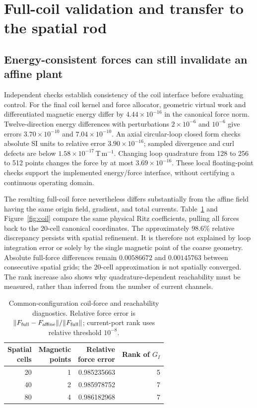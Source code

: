 \section{Full-coil validation and transfer to the spatial rod}
\label{sec:physical-results}

\subsection{Energy-consistent forces can still invalidate an affine plant}
Independent checks establish consistency of the coil interface before evaluating control. For the final coil kernel and force allocator, geometric virtual work and differentiated magnetic energy differ by $4.44\times10^{-16}$ in the canonical force norm. Twelve-direction energy differences with perturbations $2\times10^{-6}$ and $10^{-6}$ give errors $3.70\times10^{-10}$ and $7.04\times10^{-10}$. An axial circular-loop closed form checks absolute SI units to relative error $3.90\times10^{-16}$; sampled divergence and curl defects are below $1.58\times10^{-17}$\,T\,m$^{-1}$. Changing loop quadrature from 128 to 256 to 512 points changes the force by at most $3.69\times10^{-16}$. These local floating-point checks support the implemented energy/force interface, without certifying a continuous operating domain.

The resulting full-coil force nevertheless differs substantially from the affine field having the same origin field, gradient, and total currents. Table~\ref{tab:coil-quadrature} and Figure~\ref{fig:coil} compare the same physical Ritz coefficients, pulling all forces back to the 20-cell canonical coordinates. The approximately 98.6\% relative discrepancy persists with spatial refinement. It is therefore not explained by loop integration error or solely by the single magnetic point of the coarse geometry. Absolute full-force differences remain $0.00586672$ and $0.00145763$ between consecutive spatial grids; the 20-cell approximation is not spatially converged. The rank increase also shows why quadrature-dependent reachability must be measured, rather than inferred from the number of current channels.

\begin{table}[t]
\centering
\caption{Common-configuration coil-force and reachability diagnostics. Relative force error is $\|F_{\rm full}-F_{\rm affine}\|/\|F_{\rm full}\|$; current-port rank uses relative threshold $10^{-8}$.}
\label{tab:coil-quadrature}
\begin{tabular}{@{}rrrr@{}}
\toprule
\shortstack{Spatial\\cells} & \shortstack{Magnetic\\points} & \shortstack{Relative\\force error} & \shortstack{Rank of\\$G_I$}\\
\midrule
20 & 1 & 0.985235663 & 5\\
40 & 2 & 0.985978752 & 7\\
80 & 4 & 0.986182968 & 7\\
\bottomrule
\end{tabular}
\end{table}

